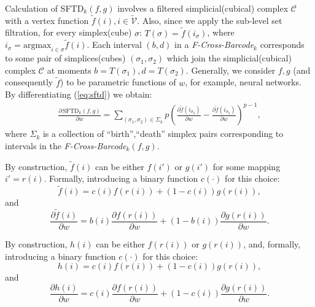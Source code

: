 \documentclass[runningheads]{llncs}
\begin{document}
Calculation of \mbox{SFTD}$_k(f, g)$ involves a filtered simplicial(cubical) complex $\mathcal{C}$ with a vertex function $\tilde{f}(i), i \in \tilde{\mathcal{V}}$. 
Also, since we apply the sub-level set filtration, for every simplex(cube) $\sigma$: $T(\sigma) = \tilde{f}(i_\sigma)$, where $i_\sigma = \text{argmax}_{i \in \sigma} \tilde{f}(i)$.
Each interval $(b,d)$ in a \textit{F-Cross-Barcode}$_k$ corresponds to some pair of simplices(cubes) $(\sigma_1, \sigma_2)$ which join the simplicial(cubical) complex $\mathcal{C}$ at moments $b=T(\sigma_1), d=T(\sigma_2)$.
Generally, we consider $f,g$ (and consequently $\tilde{f}$) to be parametric functions of $w$, for example, neural networks.
By differentiating (\ref{eq:sftd}) we obtain:
\begin{gather}
\frac{\partial \, \mbox{SFTD}_k(f, g)}{\partial w} 
= \sum_{(\sigma_1, \sigma_2) \in \Sigma_k} p \left( \frac{\partial \tilde{f}(i_{\sigma_2})}{\partial w} - \frac{\partial \tilde{f}(i_{\sigma_2})}{\partial w} \right)^{p-1},
\label{grad1}
\end{gather}
where $\Sigma_k$ is a collection of ``birth'',``death'' simplex pairs corresponding to intervals in the \textit{F-Cross-Barcode}$_{k}(f, g)$.


By construction, $\tilde{f}(i)$ can be either $f(i')$ or $g(i')$ for some mapping $i'=r(i)$. Formally, introducing a binary function $c(\cdot)$ for this choice:
\begin{equation}
\tilde{f}(i) = c(i)f(r(i)) + (1 - c(i))g(r(i)),
\end{equation}
and 
\begin{equation}
\frac{\partial \tilde{f}(i)}{\partial w} = b(i)\frac{\partial f(r(i))}{\partial w} + (1-b(i))\frac{\partial g(r(i))}{\partial w}.
\label{grad2}
\end{equation}

\iffalse
By construction, $h(i)$ can be either $f(r(i))$ or $g(r(i))$, and, formally, introducing a binary function $c(\cdot)$ for this choice:
\begin{equation*}
h(i) = c(i)f(r(i)) + (1 - c(i))g(r(i)),
\end{equation*}
and 
\begin{equation}
\frac{\partial h(i)}{\partial w} = c(i)\frac{\partial f(r(i))}{\partial w} + (1-c(i))\frac{\partial g(r(i))}{\partial w}.
\label{grad2}
\end{equation}
\end{document}
